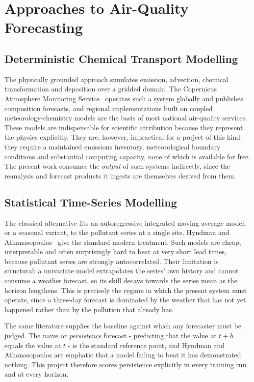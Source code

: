 \section{Approaches to Air-Quality Forecasting}

\subsection{Deterministic Chemical Transport Modelling}
The physically grounded approach simulates emission, advection, chemical
transformation and deposition over a gridded domain. The Copernicus Atmosphere
Monitoring Service~\cite{ref:cams} operates such a system globally and publishes
composition forecasts, and regional implementations built on coupled
meteorology-chemistry models are the basis of most national air-quality
services. These models are indispensable for scientific attribution because they
represent the physics explicitly. They are, however, impractical for a project of
this kind: they require a maintained emissions inventory, meteorological boundary
conditions and substantial computing capacity, none of which is available for
free. The present work consumes the \emph{output} of such systems indirectly,
since the reanalysis and forecast products it ingests are themselves derived from
them.

\subsection{Statistical Time-Series Modelling}
The classical alternative fits an autoregressive integrated moving-average model,
or a seasonal variant, to the pollutant series at a single site. Hyndman and
Athanasopoulos~\cite{ref:fpp} give the standard modern treatment. Such models are
cheap, interpretable and often surprisingly hard to beat at very short lead
times, because pollutant series are strongly autocorrelated. Their limitation is
structural: a univariate model extrapolates the series' own history and cannot
consume a weather forecast, so its skill decays towards the series mean as the
horizon lengthens. This is precisely the regime in which the present system must
operate, since a three-day forecast is dominated by the weather that has not yet
happened rather than by the pollution that already has.

The same literature supplies the baseline against which any forecaster must be
judged. The naive or \emph{persistence} forecast - predicting that the value at
$t+h$ equals the value at $t$ - is the standard reference point, and Hyndman and
Athanasopoulos are emphatic that a model failing to beat it has demonstrated
nothing. This project therefore scores persistence explicitly in every training
run and at every horizon.

